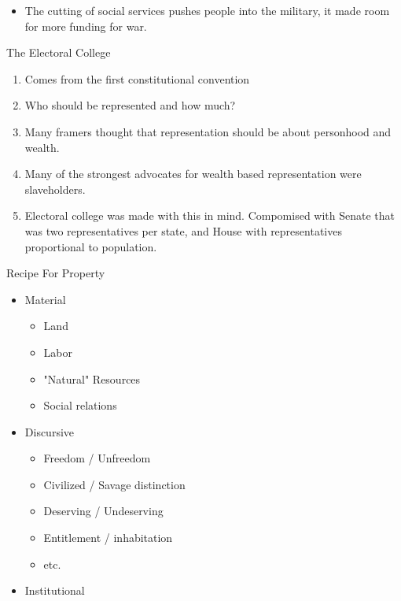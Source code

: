 \documentclass{report}
\begin{document}
\begin{description}
\begin{itemize}
            \item The cutting of social services pushes
                people into the military, it made room
                for more funding for war.
        \end{itemize}
    \item {\large The Electoral College}
        \begin{enumerate}
            \item Comes from the first constitutional convention
            \item Who should be represented and how much?
            \item Many framers thought that representation
                should be about personhood and wealth.
            \item Many of the strongest advocates for wealth
                based representation were slaveholders.
            \item Electoral college was made with this in mind.
                Compomised with Senate that was two representatives
                per state, and House with representatives proportional
                to population.
        \end{enumerate}
    \item {\large Recipe For Property}
        \begin{itemize}
            \item Material
                \begin{itemize}
                    \item Land
                    \item Labor
                    \item "Natural" Resources
                    \item Social relations
                \end{itemize}
            \item Discursive
                \begin{itemize}
                    \item Freedom / Unfreedom
                    \item Civilized / Savage distinction
                    \item Deserving / Undeserving
                    \item Entitlement / inhabitation
                    \item etc.
                \end{itemize}
            \item Institutional

\end{itemize}
\end{description}
\end{document}
